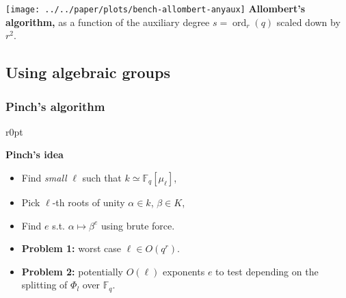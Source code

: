 \documentclass[francais]{beamer}
\def\F {\ensuremath{\mathbb{F}}}
\DeclareMathOperator{\ord}{ord}
\newcommand{\paragraph}[1]{\smallskip\textbf{#1}}
\begin{document}
\begin{frame}
    \centering
    \texttt{[image: ../../paper/plots/bench-allombert-anyaux]}
      \flushleft
      \textbf{Allombert's algorithm,} as a function of the auxiliary degree
      $s=\ord_r(q)$ scaled down by $r^2$.
\end{frame}

\subsection{Using algebraic groups}

\begin{frame}\frametitle{Pinch's algorithm}
      \begin{wrapfigure}[3]{r}{0pt}
    \end{wrapfigure}

    \paragraph{Pinch's idea}
    \begin{itemize}
    \item Find \emph{small} $\ell$ such that $k\simeq\F_q[\mu_\ell]$,
    \item Pick $\ell$-th roots of unity $\alpha\in k$, $\beta\in K$,
    \item Find $e$ s.t. $\alpha\mapsto\beta^e$ using brute force.
    \item \textbf{Problem 1:} worst case $\ell\in O(q^r)$.
    \item \textbf{Problem 2:} potentially $O(\ell)$ exponents $e$ to test
      depending on the splitting of $\Phi_l$ over $\F_q$.
    \end{itemize}
\end{frame}
\end{document}
